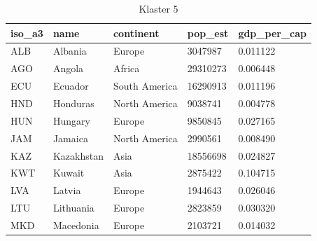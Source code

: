 \documentclass[11pt]{report}
\begin{document}
    \begin{table}[h!]
        \caption {Klaster 5} \label{tab:cl5}
        \begin{tabular}{lllll}
            \hline
            \multicolumn{1}{|l|}{iso\_a3} & \multicolumn{1}{l|}{name} & \multicolumn{1}{l|}{continent} & \multicolumn{1}{l|}{pop\_est} & \multicolumn{1}{l|}{gdp\_per\_cap} \\ \hline
            ALB                           & Albania                   & Europe                         & 3047987                       & 0.011122                           \\
            AGO                           & Angola                    & Africa                         & 29310273                      & 0.006448                           \\
            ECU                           & Ecuador                   & South America                  & 16290913                      & 0.011196                           \\
            HND                           & Honduras                  & North America                  & 9038741                       & 0.004778                           \\
            HUN                           & Hungary                   & Europe                         & 9850845                       & 0.027165                           \\
            JAM                           & Jamaica                   & North America                  & 2990561                       & 0.008490                           \\
            KAZ                           & Kazakhstan                & Asia                           & 18556698                      & 0.024827                           \\
            KWT                           & Kuwait                    & Asia                           & 2875422                       & 0.104715                           \\
            LVA                           & Latvia                    & Europe                         & 1944643                       & 0.026046                           \\
            LTU                           & Lithuania                 & Europe                         & 2823859                       & 0.030320                           \\
            MKD                           & Macedonia                 & Europe                         & 2103721                       & 0.014032                           \\

\end{tabular}
\end{table}
\end{document}

